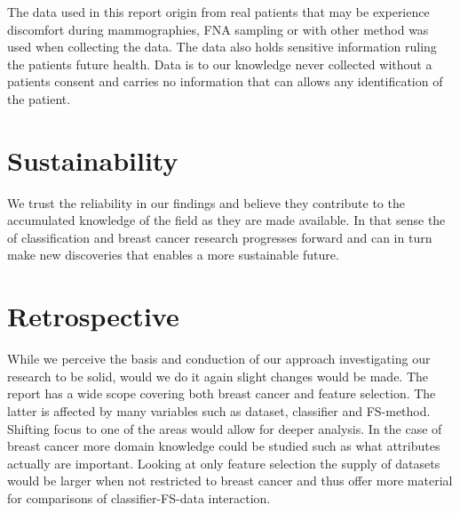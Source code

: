 The data used in this report origin from real patients that may be experience discomfort during mammographies, FNA sampling or with other method was used when collecting the data. The data also holds sensitive information ruling the patients future health. Data is to our knowledge never collected without a patients consent and carries no information that can allows any identification of the patient.

\section{Sustainability}

We trust the reliability in our findings and believe they contribute to the accumulated knowledge of the field as they are made available. In that sense the of classification and breast cancer research progresses forward and can in turn make new discoveries that enables a more sustainable future.

\section{Retrospective}

While we perceive the basis and conduction of our approach investigating our research to be solid, would we do it again slight changes would be made. The report has a wide scope covering both breast cancer and feature selection. The latter is affected by many variables such as dataset, classifier and FS-method. Shifting focus to one of the areas would allow for deeper analysis. In the case of breast cancer more domain knowledge could be studied such as what attributes actually are important. Looking at only feature selection the supply of datasets would be larger when not restricted to breast cancer and thus offer more material for comparisons of classifier-FS-data interaction.
